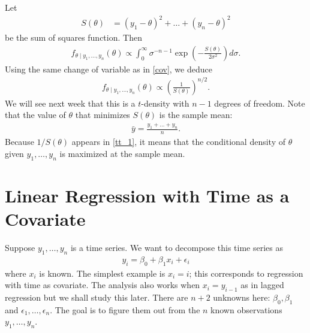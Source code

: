 \documentclass{scrartcl}
\begin{document}
Let
\begin{align*}
  S(\theta) &= (y_1-\theta)^2+ \dots +(y_n-\theta)^2
\end{align*}
be the sum of squares function. Then
\begin{align*}
  f_{\theta \mid y_1, \dots, y_n}(\theta) \propto \int_0^{\infty}
  \sigma^{-n-1} \exp \left(-\frac{S(\theta)}{2 
                           \sigma^2} \right) d \sigma.
\end{align*}
Using the same change of variable as in \eqref{cov}, we deduce
\begin{align}\label{tt_1}
  f_{\theta \mid y_1, \dots, y_n}(\theta) \propto \left(
  \frac{1}{S(\theta)} \right)^{n/2}. 
\end{align}
We will see next week that this is a $t$-density with $n-1$ degrees of
freedom. Note that the value of $\theta$ that  minimizes $S(\theta)$
is the sample mean:
\begin{align*}
  \bar{y} = \frac{y_1 + \dots + y_n}{n}. 
\end{align*}
Because $1/S(\theta)$ appears in \eqref{tt_1}, it means that the
conditional density of $\theta$ given $y_1, \dots, y_n$ is maximized
at the sample mean.


\section{Linear Regression with Time as a Covariate}

Suppose $y_1, \dots, y_n$ is a time series. We want to decompose this
time series as
\begin{align*}
  y_i = \beta_0 + \beta_1 x_i + \epsilon_i
\end{align*}
where $x_i$ is known. The simplest example is $x_i = i$; this
corresponds to regression with time as covariate. The analysis also
works when $x_i = y_{i-1}$ as in lagged regression but we shall study
this later. There are $n+2$ unknowns here: $\beta_0, \beta_1$ and
$\epsilon_1, \dots, \epsilon_n$. The goal is to figure them out from
the $n$ known observations $y_1, \dots, y_n$.
\end{document}
